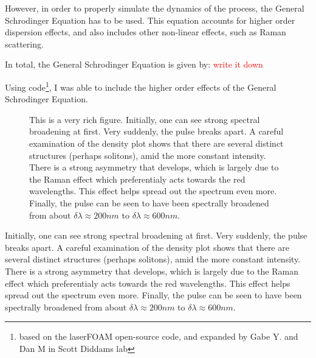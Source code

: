 \documentclass[12pt, titlepage]{article}
\begin{document}
\begin{spacing}{1.1}
However, in order to properly simulate the dynamics of the process, the General Schrodinger Equation has to be used. This equation accounts for higher order dispersion effects, and also includes other non-linear effects, such as Raman scattering. 

In total, the General Schrodinger Equation is given by:
\textcolor{red}{write it down}

Using code\footnote{based on the laserFOAM open-source code, and expanded by Gabe Y. and Dan M in Scott Diddams lab}, I was able to include the higher order effects of the General Schrodinger Equation.
\begin{figure}[h!]
 \centering
                    \caption{This is a very rich figure.
                    Initially, one can see strong spectral broadening at first.
                    Very suddenly, the pulse breaks apart.
                    A careful examination of the density plot shows that there are several distinct structures (perhaps solitons), amid the more constant intensity.
                    There is a strong asymmetry that develops, which is largely due to the Raman effect which preferentialy acts towards the red wavelengths.
                    This effect helps spread out the
                    spectrum even more. Finally, the pulse can be seen to have been spectrally broadened from about $\delta \lambda \approx 200 nm$ to $\delta \lambda \approx 600 nm$.}
                    
\label{intial spectrum}
\end{figure}

Initially, one can see strong spectral broadening at first.
Very suddenly, the pulse breaks apart.
A careful examination of the density plot shows that there are several distinct structures (perhaps solitons), amid the more constant intensity.
There is a strong asymmetry that develops, which is largely due to the Raman effect which preferentialy acts towards the red wavelengths.
This effect helps spread out the
spectrum even more. Finally, the pulse can be seen to have been spectrally broadened from about $\delta \lambda \approx 200 nm$ to $\delta \lambda \approx 600 nm$.\protect\footnotemark

\end{spacing}

{}
\end{document}

